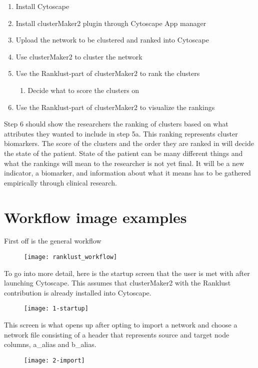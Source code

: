 \begin{enumerate}
    \item Install Cytoscape
    \item Install clusterMaker2 plugin through Cytoscape App manager
    \item Upload the network to be clustered and ranked into Cytoscape
    \item Use clusterMaker2 to cluster the network
    \item Use the Ranklust-part of clusterMaker2 to rank the clusters
        \begin{enumerate}
            \item Decide what to score the clusters on
        \end{enumerate}
    \item Use the Ranklust-part of clusterMaker2 to visualize the rankings
\end{enumerate}

Step 6 should show the researchers the ranking of clusters based on what
attributes they wanted to include in step 5a. This ranking represents cluster
biomarkers. The score of the clusters and the order they are ranked in will
decide the state of the patient. State of the patient can be many different
things and what the rankings will mean to the researcher is not yet final. It
will be a new indicator, a biomarker, and information about what it means has to
be gathered empirically through clinical research.

\section{Workflow image examples}
First off is the general workflow
\begin{figure}[H]
    \texttt{[image: ranklust\_workflow]}
\end{figure}

To go into more detail, here is the startup screen that the user is met with
after launching Cytoscape. This assumes that clusterMaker2 with the Ranklust
contribution is already installed into Cytoscape.
\begin{figure}[H]
    \texttt{[image: 1-startup]}
\end{figure}

This screen is what opens up after opting to import a network and choose a
network file consisting of a header that represents source and target node
columns, a\_alias and b\_alias.
\begin{figure}[H]
    \texttt{[image: 2-import]}
\end{figure}


